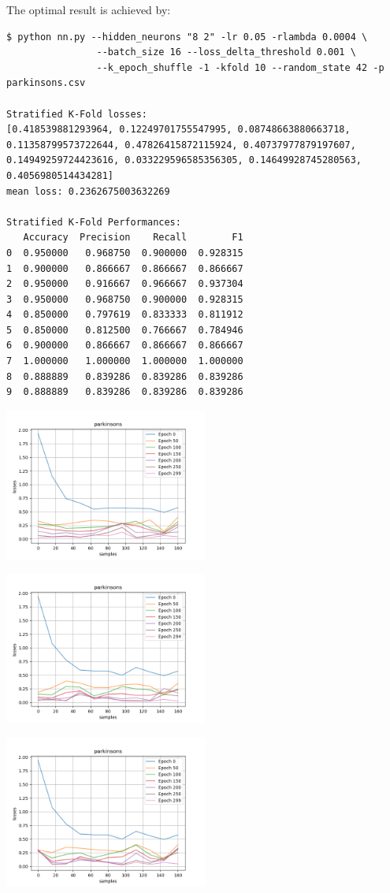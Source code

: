 The optimal result is achieved by: 

\begin{verbatim}
$ python nn.py --hidden_neurons "8 2" -lr 0.05 -rlambda 0.0004 \
                --batch_size 16 --loss_delta_threshold 0.001 \
                --k_epoch_shuffle -1 -kfold 10 --random_state 42 -p parkinsons.csv

Stratified K-Fold losses: 
[0.418539881293964, 0.12249701755547995, 0.08748663880663718, 0.11358799573722644, 0.47826415872115924, 0.40737977879197607, 0.14949259724423616, 0.033229596585356305, 0.14649928745280563, 0.4056980514434281] 
mean loss: 0.2362675003632269

Stratified K-Fold Performances: 
   Accuracy  Precision    Recall        F1
0  0.950000   0.968750  0.900000  0.928315
1  0.900000   0.866667  0.866667  0.866667
2  0.950000   0.916667  0.966667  0.937304
3  0.950000   0.968750  0.900000  0.928315
4  0.850000   0.797619  0.833333  0.811912
5  0.850000   0.812500  0.766667  0.784946
6  0.900000   0.866667  0.866667  0.866667
7  1.000000   1.000000  1.000000  1.000000
8  0.888889   0.839286  0.839286  0.839286
9  0.888889   0.839286  0.839286  0.839286
\end{verbatim}


\includegraphics[width=0.5\textwidth]{./figures/proj_parkinsons_best.png}

\includegraphics[width=0.5\textwidth]{./figures/proj_parkinsons_1.png}

\includegraphics[width=0.5\textwidth]{./figures/proj_parkinsons_2.png}

